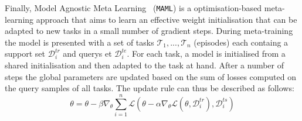 Finally, Model Agnostic Meta Learning~\cite{maml} (\texttt{MAML}) is a optimisation-based meta-learning approach that aims to learn an effective weight initialisation that can be adapted to new tasks in a small number of gradient steps. During meta-training the model is presented with a set of tasks $\mathcal{T}_1, ..., \mathcal{T}_n$ (episodes) each containg a support set $\mathcal{D}_i^{tr}$ and querys et $\mathcal{D}_i^{te}$. For each task, a model is initialised from a shared initialisation and then adapted to the task at hand. After a number of steps the global parameters are updated based on the sum of 
losses computed on the query samples of all tasks. The update rule can thus be described as follows:
$$
\theta = 
\theta - \beta \nabla_{\theta} \sum_{i=1}^{n}
\mathcal{L}(\theta - \alpha \nabla_{\theta} \mathcal{L}(\theta, \mathcal{D}_{i}^{tr}), \mathcal{D}_{i}^{ts})
$$







